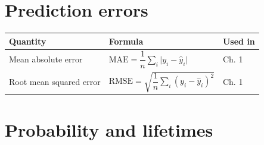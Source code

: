 \documentclass[
  letterpaper,
  DIV=11,
  numbers=noendperiod]{scrreprt}
\begin{document}
\section{Prediction errors}\label{prediction-errors}

\begin{longtable}[]{@{}
  >{\raggedright\arraybackslash}p{}
  >{\raggedright\arraybackslash}p{}
  >{\raggedright\arraybackslash}p{}@{}}
\toprule\noalign{}
\begin{minipage}[b]{\linewidth}\raggedright
Quantity
\end{minipage} & \begin{minipage}[b]{\linewidth}\raggedright
Formula
\end{minipage} & \begin{minipage}[b]{\linewidth}\raggedright
Used in
\end{minipage} \\
\midrule\noalign{}
\endhead
\bottomrule\noalign{}
\endlastfoot
Mean absolute error &
\(\text{MAE} = \dfrac{1}{n}\sum_i \lvert y_i - \hat y_i \rvert\) & Ch.
1 \\
Root mean squared error &
\(\text{RMSE} = \sqrt{\dfrac{1}{n}\sum_i (y_i - \hat y_i)^2}\) & Ch.
1 \\
\end{longtable}

\section{Probability and lifetimes}\label{probability-and-lifetimes}
\end{document}
